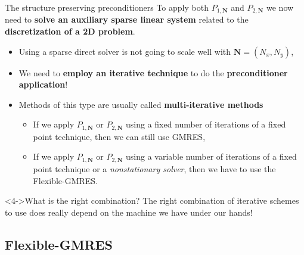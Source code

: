 \documentclass[aspectratio=169,xcolor=dvipsnames]{beamer}
\begin{document}
	\begin{frame}{The structure preserving preconditioners}
	\faExclamationCircle\;To apply both $P_{1,\mathbf{N}}$ and $P_{2,\mathbf{N}}$ we now need to \textbf{solve an auxiliary sparse linear system} related to the \textbf{discretization of a 2D problem}.
	
	\begin{itemize}
		\item[\faHammer] Using a \alert{sparse direct solver} is not going to scale well with $\mathbf{N} = (N_x,N_y)$,
		\item[\faBomb]<2-> We need to \textbf{employ an iterative technique} to do the \textbf{preconditioner application}!
		\item[\faWrench]<3-> Methods of this type are usually called \textbf{multi-iterative methods}
		\begin{itemize}
			\item[$\Rightarrow$] \normalsize If we apply $P_{1,\mathbf{N}}$ or $P_{2,\mathbf{N}}$ using a fixed number of iterations of a fixed point technique, then we can still use GMRES,
			\item[$\Rightarrow$] \normalsize If we  apply $P_{1,\mathbf{N}}$ or $P_{2,\mathbf{N}}$ using a variable number of iterations of a fixed point technique or a \emph{nonstationary solver}, then we have to use the Flexible-GMRES.
		\end{itemize}
	\end{itemize}

	\begin{exampleblock}<4->{\faQuestionCircle\;What is the right combination?}
	The right combination of iterative schemes to use does really depend on the machine we have under our hands!
	\end{exampleblock}
	
	\end{frame}

	\subsection{Flexible-GMRES}
\end{document}
